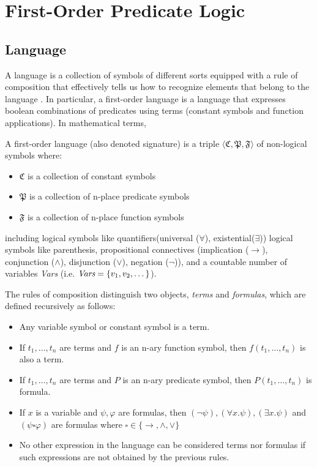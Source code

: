 \section{First-Order Predicate Logic}

\subsection{Language}
A language is a collection of symbols of different sorts equipped with a rule of composition that effectively tells us how to recognize elements that belong to the language \cite{DBLP:books/daglib/0080654}. In particular, a first-order language is a language that expresses boolean combinations of predicates using terms (constant symbols and function applications). In mathematical terms, 

\begin{definition}
 A first-order language (also denoted signature) is a triple $\langle \mathfrak{C}, \mathfrak{P}, \mathfrak{F} \rangle$ of non-logical symbols where:

\begin{itemize}
  \item $\mathfrak{C}$ is a collection of constant symbols
  \item $\mathfrak{P}$ is a collection of n-place predicate symbols
  \item $\mathfrak{F}$ is a collection of n-place function symbols
\end{itemize}

including logical symbols like quantifiers(universal ($\forall$), existential($\exists$)) logical symbols like parenthesis, propositional connectives (implication ($\rightarrow$), conjunction ($\land$), disjunction ($\lor$), negation ($\neg$)), and a countable number of variables \emph{Vars} (i.e. $\emph{Vars} = \{v_1, v_2, \dots\}$).

The rules of composition distinguish two objects, \emph{terms} and \emph{formulas}, which are defined recursively as follows:

\begin{itemize}
  \item Any variable symbol or constant symbol is a term.
  \item If $t_1, \dots, t_n$ are terms and $f$ is an n-ary function symbol, then $f(t_1, \dots, t_n)$ is also a term.
  \item If $t_1, \dots, t_n$ are terms and $P$ is an n-ary predicate symbol, then $P(t_1, \dots, t_n)$ is formula.
  \item If $x$ is a variable and $\psi, \varphi$ are formulas, 
    then $(\neg \psi), (\forall x . \psi), (\exists x . \psi)$ 
    and $(\psi \square \varphi)$ are formulas where $\square \in \{\rightarrow, \land, \lor\}$
  \item No other expression in the language can be considered terms nor formulas if such expressions are not obtained by the previous rules.
\end{itemize}


\end{definition}
